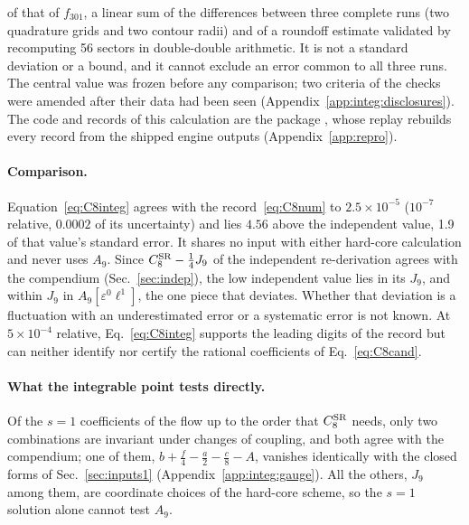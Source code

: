 \documentclass[11pt,a4paper]{article}
\numberwithin{equation}{section}
\newcommand{\CSR}{C^{\rm SR}}
\newcommand{\file}[1]{\path{#1}}
\newcommand{\sci}[2]{#1\times10^{#2}}
\begin{document}
of that of $f_{301}$, a linear sum of the differences between three complete runs (two
quadrature grids and two contour radii) and of a roundoff estimate validated by recomputing 56 sectors in double-double
arithmetic. It is not a standard deviation or a bound, and it cannot exclude an error common to all three runs. The
central value was frozen before any comparison; two criteria of the checks were amended after their data had been seen
(Appendix~\ref{app:integ:disclosures}). The code and records of this calculation are the package
\file{code/integ_d1/}, whose replay rebuilds every record from the shipped engine outputs (Appendix~\ref{app:repro}).

\paragraph{Comparison.} Equation~\eqref{eq:C8integ} agrees with the record~\eqref{eq:C8num} to $\sci{2.5}{-5}$
($10^{-7}$ relative, $0.0002$ of its uncertainty) and lies $4.56$ above the independent value, 1.9 of that value's
standard error. It shares no input with either hard-core calculation and never uses $A_9$. Since $\CSR_8-\frac14J_9$ of
the independent re-derivation agrees with the compendium (Sec.~\ref{sec:indep}), the low independent value lies in its
$J_9$, and within $J_9$ in $A_9[\varepsilon^0\ell^1]$, the one piece that deviates. Whether that deviation is a
fluctuation with an underestimated error or a systematic error is not known. At $\sci{5}{-4}$ relative,
Eq.~\eqref{eq:C8integ} supports the leading digits of the record but can neither identify nor certify the rational
coefficients of Eq.~\eqref{eq:C8cand}.

\paragraph{What the integrable point tests directly.} Of the $s=1$ coefficients of the flow up to the order that
$\CSR_8$ needs, only two combinations are invariant under changes of coupling, and both agree with the compendium; one
of them, $b+\frac f4-\frac a2-\frac c8-A$, vanishes identically with the closed forms of Sec.~\ref{sec:inputs1}
(Appendix~\ref{app:integ:gauge}). All the others, $J_9$ among them, are coordinate choices of the hard-core scheme, so
the $s=1$ solution alone cannot test $A_9$.
\end{document}
